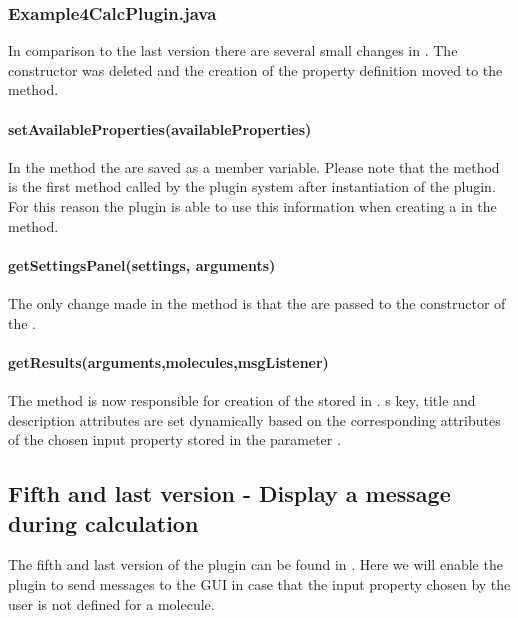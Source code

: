   \subsubsection{Example4CalcPlugin.java}
  In comparison to the last version there are several small changes in .
  The constructor was deleted and the creation of the
  property definition moved to the  method.

  \paragraph{setAvailableProperties(availableProperties)}
  In the  method the
   are saved as a member variable.
  Please note that the  method is
  the first method called by the plugin system after instantiation of the plugin.
  For this reason the plugin is able to use this information when
  creating a  in the  method.

  \paragraph{getSettingsPanel(settings, arguments)}
  The only change made in the 
  method is that the  are passed
  to the constructor of the .

  \paragraph{getResults(arguments,molecules,msgListener)}
  The  method is now responsible for creation
  of the  stored in .
  s key, title and description attributes are set dynamically based on the
  corresponding attributes of the chosen input property stored in the parameter .

\subsection{Fifth and last version - Display a message during calculation}
The fifth and last version of the plugin can be found in
.
Here we will enable the plugin to send messages to the GUI
in case that the input property chosen by the user is not defined for a molecule.

